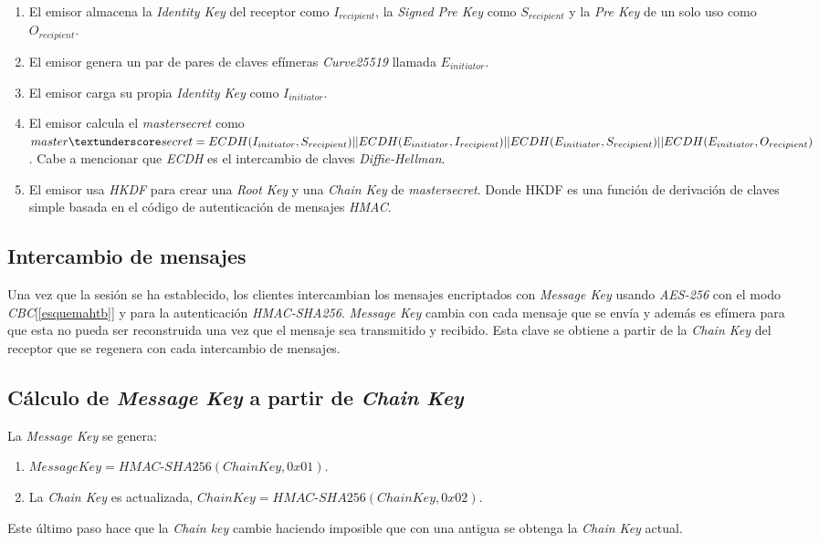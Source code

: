 \begin{enumerate}
	\item El emisor almacena la \emph{Identity Key} del receptor como $I_{recipient}$, la \emph{Signed Pre Key} como $S_{recipient}$ y la \emph{Pre Key} de un solo uso como $O_{recipient}$.
	\item El emisor genera un par de pares de claves efímeras \emph{Curve25519} llamada $E_{initiator}$.
	\item El emisor carga su propia \emph{Identity Key} como $I_{initiator}$.
	\item El emisor calcula el \emph{master\textunderscore secret} como $master\textunderscore secret = ECDH(I_{initiator}, S_{recipient}) ||\\ ECDH(E_{initiator}, I_{recipient}) || ECDH(E_{initiator}, S_{recipient}) || ECDH(E_{initiator}, O_{recipient})$. Cabe a mencionar que \emph{ECDH} es el intercambio de claves \emph{Diffie-Hellman}.
	\item El emisor usa \emph{HKDF} para crear una \emph{Root Key} y una \emph{Chain Key} de \emph{master\textunderscore secret}. Donde HKDF es una función de derivación de claves simple basada en el código de autenticación de mensajes \emph{HMAC}\cite{cekd}.
\end{enumerate}

\subsection{Intercambio de mensajes}
Una vez que la sesión se ha establecido, los clientes intercambian los mensajes encriptados con \emph{Message Key} usando \emph{AES-256} con el modo \emph{CBC}[\ref{esquemahtb}] y para la autenticación \emph{HMAC-SHA256}. \emph{Message Key} cambia con cada mensaje que se envía y además es efímera para que esta no pueda ser reconstruida una vez que el mensaje sea transmitido y recibido. Esta clave se obtiene a partir de la \emph{Chain Key} del receptor que se regenera con cada intercambio de mensajes. 

\subsection{Cálculo de \emph{Message Key} a partir de \emph{Chain Key}}
La \emph{Message Key} se genera:
\begin{enumerate}
	\item $Message Key = HMAC$-$SHA256(Chain Key, 0x01)$.
	\item La \emph{Chain Key} es actualizada, $Chain Key = HMAC$-$SHA256(Chain Key, 0x02)$.
\end{enumerate}
Este último paso hace que la \emph{Chain key} cambie haciendo imposible que con una  antigua se obtenga la \emph{Chain Key} actual.


